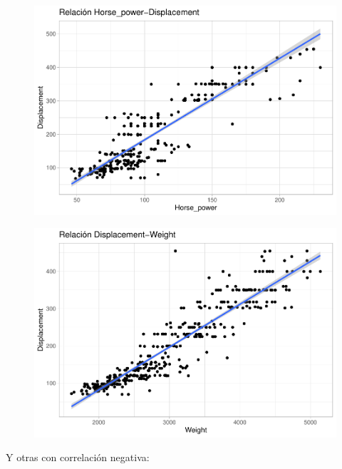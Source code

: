 \begin{figure}[H]\includegraphics[width=.9\linewidth]{img/EDA_files/figure-latex/unnamed-chunk-21-1} \caption{}\end{figure}
\begin{figure}[H]\includegraphics[width=.9\linewidth]{img/EDA_files/figure-latex/unnamed-chunk-21-2} \caption{}\end{figure}

Y otras con correlación negativa:

